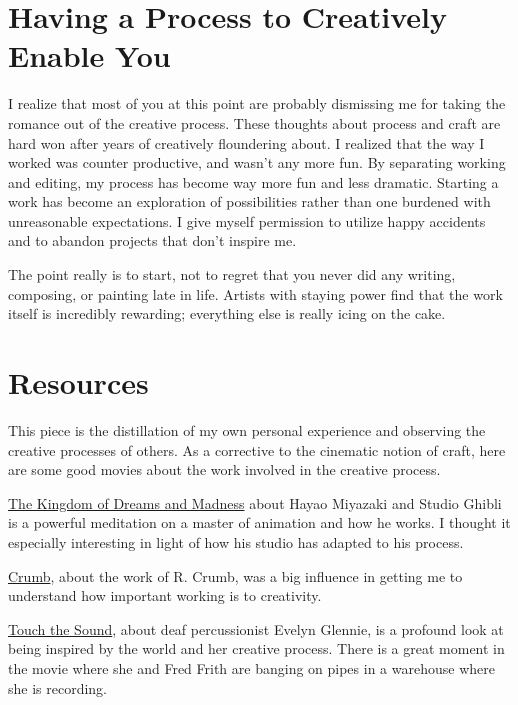 \documentclass[
]{book}
\begin{document}
\hypertarget{having-a-process-to-creatively-enable-you}{%
\section{Having a Process to Creatively Enable You}\label{having-a-process-to-creatively-enable-you}}

I realize that most of you at this point are probably dismissing me for taking the romance out of the creative process. These thoughts about process and craft are hard won after years of creatively floundering about. I realized that the way I worked was counter productive, and wasn't any more fun. By separating working and editing, my process has become way more fun and less dramatic. Starting a work has become an exploration of possibilities rather than one burdened with unreasonable expectations. I give myself permission to utilize happy accidents and to abandon projects that don't inspire me.

The point really is to start, not to regret that you never did any writing, composing, or painting late in life. Artists with staying power find that the work itself is incredibly rewarding; everything else is really icing on the cake.

\hypertarget{resources-1}{%
\section{Resources}\label{resources-1}}

This piece is the distillation of my own personal experience and observing the creative processes of others. As a corrective to the cinematic notion of craft, here are some good movies about the work involved in the creative process.

\href{http://m.imdb.com/title/tt3204392/}{The Kingdom of Dreams and Madness} about Hayao Miyazaki and Studio Ghibli is a powerful meditation on a master of animation and how he works. I thought it especially interesting in light of how his studio has adapted to his process.

\href{http://m.imdb.com/title/tt0109508/}{Crumb}, about the work of R. Crumb, was a big influence in getting me to understand how important working is to creativity.

\href{http://m.imdb.com/title/tt0424509/}{Touch the Sound}, about deaf percussionist Evelyn Glennie, is a profound look at being inspired by the world and her creative process. There is a great moment in the movie where she and Fred Frith are banging on pipes in a warehouse where she is recording.
\end{document}
